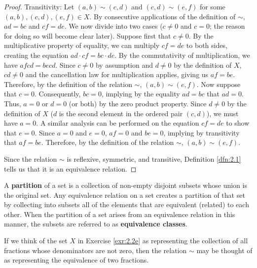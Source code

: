 \documentclass[../main.tex]{subfiles}
\begin{document}
\begin{exercise}
\begin{enumerate}[label={\alph*)},ref={\theexercise\alph*}]
\begin{proof}
            Transitivity: Let $(a,b)\sim(c,d)$ and $(c,d)\sim(e,f)$ for some $(a,b),(c,d),(e,f)\in X$. By consecutive applications of the definition of $\sim$, $ad=bc$ and $cf=de$. We now divide into two cases ($c\neq 0$ and $c=0$; the reason for doing so will become clear later). Suppose first that $c\neq 0$. By the multiplicative property of equality, we can multiply $cf=de$ to both sides, creating the equation $ad\cdot cf=bc\cdot de$. By the commutativity of multiplication, we have $afcd=becd$. Since $c\neq 0$ by assumption and $d\neq 0$ by the definition of $X$, $cd\neq 0$ and the cancellation law for multiplication applies, giving us $af=be$. Therefore, by the definition of the relation $\sim$, $(a,b)\sim(e,f)$. Now suppose that $c=0$. Consequently, $bc=0$, implying by the equality $ad=bc$ that $ad=0$. Thus, $a=0$ or $d=0$ (or both) by the zero product property. Since $d\neq 0$ by the definition of $X$ ($d$ is the second element in the ordered pair $(c,d)$), we must have $a=0$. A similar analysis can be performed on the equation $cf=de$ to show that $e=0$. Since $a=0$ and $e=0$, $af=0$ and $be=0$, implying by transitivity that $af=be$. Therefore, by the definition of the relation $\sim$, $(a,b)\sim(e,f)$.\par
            Since the relation $\sim$ is reflexive, symmetric, and transitive, Definition \ref{dfn:2.1} tells us that it is an equivalence relation.
        \end{proof}
    \end{enumerate}
\end{exercise}

\begin{remark}\label{rmk:2.3}
    A \textbf{partition} of a set is a collection of non-empty disjoint subsets whose union is the original set. Any equivalence relation on a set creates a partition of that set by collecting into subsets all of the elements that are equivalent (related) to each other. When the partition of a set arises from an equivalence relation in this manner, the subsets are referred to as \textbf{equivalence classes}.
\end{remark}

\begin{remark}\label{rmk:2.4}
    If we think of the set $X$ in Exercise \ref{exr:2.2e} as representing the collection of all fractions whose denominators are not zero, then the relation $\sim$ may be thought of as representing the equivalence of two fractions.
\end{remark}
\end{document}
